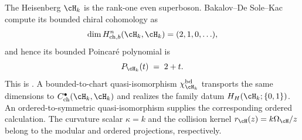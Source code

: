 \begin{example}
\label{ex:ord-ch-hoch-heisenberg}
The Heisenberg $\cH_k$ is the rank-one even superboson.  Bakalov--De
Sole--Kac compute its bounded chiral cohomology as
\[
 \dim H^n_{\mathrm{ch},b}(\cH_k,\cH_k)
 =(2,1,0,\ldots),
\]
and hence its bounded Poincar\'e polynomial is
\begin{equation}\label{eq:heis-poincare-poly}
P_{\cH_k}(t)
\;=\; 2+t.
\end{equation}
This is \cite[Theorem~7.4]{BDSK21}.  A bounded-to-chart
quasi-isomorphism $\chi_{\cH_k}^{\mathrm{bd}}$ transports the same
dimensions to $C^\bullet_{\mathrm{ch}}(\cH_k,\cH_k)$ and realizes the
family datum $H_H(\cH_k;\{0,1\})$.  An ordered-to-symmetric
quasi-isomorphism supplies the corresponding ordered calculation.
The curvature scalar $\kappa=k$ and the collision kernel
$r_{\cH}(z)=k\Omega_{\cH}/z$ belong to the modular and ordered
projections, respectively.
\end{example}

